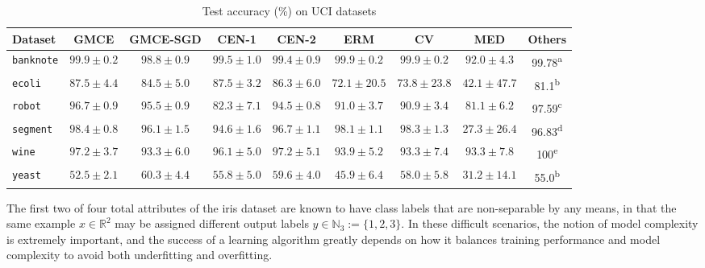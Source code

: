 \documentclass{llncs}
\begin{document}
	\begin{table}[t]
		\caption{Test accuracy (\%) on UCI datasets}
		\label{tab:uci_experiments}
		\centering
		\begin{tabular}{lcccccccc}
			Dataset & G\gls{MCE} & G\gls{MCE}-SGD & \gls{CEN}-1 & \gls{CEN}-2 & ERM & CV & MED & Others \\
			\midrule
			\texttt{banknote} & $\mathbf{99.9 \pm 0.2}$ & $98.8 \pm 0.9$ & $99.5 \pm 1.0$ & $99.4 \pm 0.9$ & $\mathbf{99.9 \pm 0.2}$ & $\mathbf{99.9 \pm 0.2}$ & $92.0 \pm 4.3$ & 99.78\textsuperscript{a} \\
			\texttt{ecoli} & $\mathbf{87.5 \pm 4.4}$ & $84.5 \pm 5.0$ & $\mathbf{87.5 \pm 3.2}$ & $86.3 \pm 6.0$ & $72.1 \pm 20.5$ & $73.8 \pm 23.8$ & $42.1 \pm 47.7$ & 81.1\textsuperscript{b} \\
			\texttt{robot} & $\mathbf{96.7 \pm 0.9}$ & $95.5 \pm 0.9$ & $82.3 \pm 7.1$ & $94.5 \pm 0.8$ & $91.0 \pm 3.7$ & $90.9 \pm 3.4$ & $81.1 \pm 6.2$ & 97.59\textsuperscript{c} \\
			\texttt{segment} & $\mathbf{98.4 \pm 0.8}$ & $96.1 \pm 1.5$ & $94.6 \pm 1.6$ & $96.7 \pm 1.1$ & $98.1 \pm 1.1$ & $98.3 \pm 1.3$ & $27.3 \pm 26.4$ & 96.83\textsuperscript{d} \\
			\texttt{wine} & $\mathbf{97.2 \pm 3.7}$ & $93.3 \pm 6.0$ & $96.1 \pm 5.0$ & $97.2 \pm 5.1$ & $93.9 \pm 5.2$ & $93.3 \pm 7.4$ & $93.3 \pm 7.8$ & 100\textsuperscript{e} \\
			\texttt{yeast} & $52.5 \pm 2.1$ & $\mathbf{60.3 \pm 4.4}$ & $55.8 \pm 5.0$ & $59.6 \pm 4.0$ & $45.9 \pm 6.4$ & $58.0 \pm 5.8$ & $31.2 \pm 14.1$ & 55.0\textsuperscript{b} \\
		\end{tabular}
	\end{table}
	
	The first two of four total attributes of the iris dataset \citep{fisher1936use} are known to have class labels that are non-separable by any means, in that the same example $x \in \mathbb{R}^{2}$ may be assigned different output labels $y \in \mathbb{N}_{3} := \{1, 2, 3\}$. In these difficult scenarios, the notion of model complexity is extremely important, and the success of a learning algorithm greatly depends on how it balances training performance and model complexity to avoid both underfitting and overfitting. 
	
\end{document}
